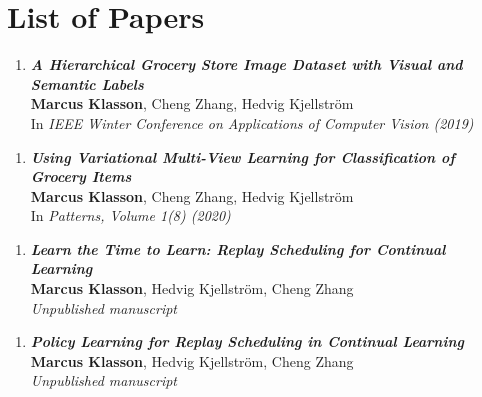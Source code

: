 
\chapter{List of Papers}
\label{chap:list_of_papers}

\begin{enumerate}[\textbf{A}]
	\item \textbf{\textit{A Hierarchical Grocery Store Image Dataset with Visual and Semantic Labels}} \\
	\textbf{Marcus Klasson}, Cheng Zhang, Hedvig Kjellström \\
	In \textit{IEEE Winter Conference on Applications of Computer Vision (2019)}
\end{enumerate}

\begin{enumerate}[\textbf{B}]
	\item \textbf{\textit{Using Variational Multi-View Learning for Classification of Grocery Items}} \\
	\textbf{Marcus Klasson}, Cheng Zhang, Hedvig Kjellström \\
	In \textit{Patterns, Volume 1(8) (2020)}
\end{enumerate}

\begin{enumerate}[\textbf{C}]
	\item \textbf{\textit{Learn the Time to Learn: Replay Scheduling for Continual Learning}} \\
	\textbf{Marcus Klasson}, Hedvig Kjellström, Cheng Zhang \\
	\textit{Unpublished manuscript}
\end{enumerate}

\begin{enumerate}[\textbf{D}]
	\item \textbf{\textit{Policy Learning for Replay Scheduling in Continual Learning}} \\
	\textbf{Marcus Klasson}, Hedvig Kjellström, Cheng Zhang \\
	\textit{Unpublished manuscript}
\end{enumerate}



\begin{comment}
Other contributions by the author not included in the thesis.
\begin{enumerate}[I]
	\setcounter{enumi}{1}
	\item \textbf{\textit{Title of paper}} \\
	\textbf{First author}, Second author \\
	\textit{Journal (year)}
\end{enumerate}
\end{comment}
